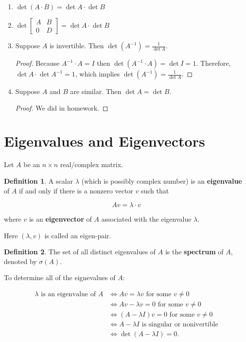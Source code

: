 \documentclass[12pt]{article}
\theoremstyle{definition}
\newtheorem*{definition}{Definition}
\begin{document}
\begin{enumerate}[label = (\arabic*)]
\item $\det (A \cdot B) = \det A \cdot \det B$

\item $\det \begin{bmatrix} A & B \\ 0 & D \end{bmatrix} = \det A \cdot \det B$

\item Suppose $A$ is invertible. Then $\displaystyle \det (A^{-1}) = \frac{1}{\det A}$.

\begin{proof}
Because $A^{-1} \cdot A = I$ then $\det ( A^{-1} \cdot A ) = \det I = 1$. Therefore,
$\det A \cdot \det A^{-1} = 1$, which implies $\displaystyle \det (A^{-1}) = \frac{1}{\det A}$.
\end{proof}

\item Suppose $A$ and $B$ are similar. Then $\det A = \det B$.

\begin{proof}
We did in homework.
\end{proof}
\end{enumerate}

\section{Eigenvalues and Eigenvectors}

Let $A$ be an $n \times n$ real/complex matrix.

\begin{definition}
A scalar $\lambda$ (which is possibly complex number) is an \textbf{eigenvalue} of $A$ if and only
if there is a nonzero vector $v$ such that

\[Av = \lambda \cdot v\]

where $v$ is an \textbf{eigenvector} of $A$ associated with the eigenvalue $\lambda$.

Here $(\lambda, v)$ is called an eigen-pair.
\end{definition}


\begin{definition}
The set of all distinct eigenvalues of $A$ is the \textbf{spectrum} of $A$, denoted by $\sigma (A)$.
\end{definition}


\noindent To determine all of the eignevalues of $A$:

\begin{align*}
\lambda \text{ is an eigenvalue of } A &\iff Av = \lambda v \text{ for some } v \neq 0 \\
&\iff Av - \lambda v = 0 \text{ for some } v \neq 0 \\
&\iff (A - \lambda I) v = 0 \text{ for some } v \neq 0 \\
&\iff A - \lambda I \text{ is singular or nonivertible} \\
&\iff \det(A - \lambda I) = 0.
\end{align*}
\end{document}
